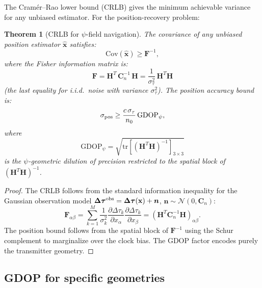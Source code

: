 \documentclass[aps,prd,twocolumn,superscriptaddress,nofootinbib,longbibliography]{revtex4-2}
\newtheorem{theorem}{Theorem}
\begin{document}
The Cram\'er--Rao lower bound (CRLB) gives the minimum achievable
variance for any unbiased estimator. For the position-recovery problem:

\begin{theorem}[CRLB for $\psi$-field navigation]\label{thm:CRLB}
The covariance of any unbiased position estimator $\hat{\mathbf{x}}$
satisfies:
\begin{equation}\label{eq:CRLB}
\mathrm{Cov}(\hat{\mathbf{x}}) \geq \mathbf{F}^{-1},
\end{equation}
where the Fisher information matrix is:
\begin{equation}\label{eq:Fisher}
\boxed{
\mathbf{F} = \mathbf{H}^T\,\mathbf{C}_n^{-1}\,\mathbf{H}
= \frac{1}{\sigma_\tau^2}\,\mathbf{H}^T\mathbf{H}
}
\end{equation}
(the last equality for i.i.d.\ noise with variance $\sigma_\tau^2$).
The position accuracy bound is:
\begin{equation}\label{eq:pos-bound}
\sigma_{\rm pos} \geq \frac{c\,\sigma_\tau}{n_0}\,\mathrm{GDOP}_\psi,
\end{equation}
where
\begin{equation}\label{eq:GDOP-def}
\mathrm{GDOP}_\psi = \sqrt{\mathrm{tr}\left[(\mathbf{H}^T\mathbf{H})^{-1}\right]_{3\times3}}
\end{equation}
is the $\psi$-geometric dilution of precision restricted to the spatial
block of $(\mathbf{H}^T\mathbf{H})^{-1}$.
\end{theorem}

\begin{proof}
The CRLB follows from the standard information inequality for the
Gaussian observation model
$\boldsymbol{\Delta\tau}^{\rm obs} = \boldsymbol{\Delta\tau}(\mathbf{x}) + \boldsymbol{n}$,
$\boldsymbol{n} \sim \mathcal{N}(0, \mathbf{C}_n)$:
\begin{equation}
\mathbf{F}_{\alpha\beta} = \sum_{k=1}^M \frac{1}{\sigma_k^2}
\frac{\partial\Delta\tau_k}{\partial x_\alpha}
\frac{\partial\Delta\tau_k}{\partial x_\beta}
= (\mathbf{H}^T\mathbf{C}_n^{-1}\mathbf{H})_{\alpha\beta}.
\end{equation}
The position bound follows from the spatial block of $\mathbf{F}^{-1}$
using the Schur complement to marginalize over the clock bias.
The GDOP factor encodes purely the transmitter geometry.
\end{proof}

\subsection{GDOP for specific geometries}\label{sec:GDOP-specific}
\end{document}

